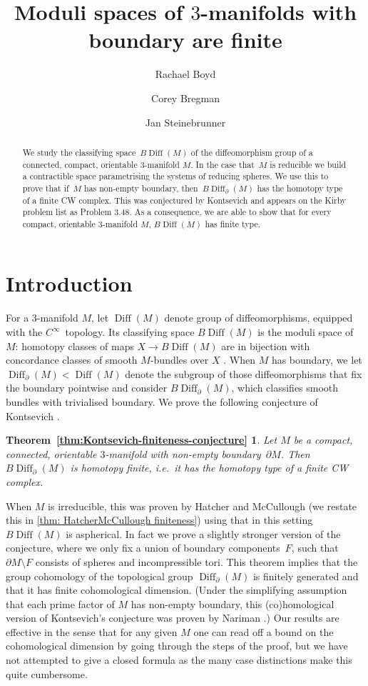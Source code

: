 \documentclass{amsart}
\title{Moduli spaces of $3$-manifolds with boundary are finite}
\author{Rachael Boyd}
\author{Corey Bregman}
\author{Jan Steinebrunner}
\theoremstyle{plain}
\theoremstyle{definition}
\DeclareMathOperator\Diff{Diff}
\newcommand{\DiffB}{\Diff_\partial}
\newcommand{\BDiff}{B\!\Diff}
\newcommand{\fakeenv}{} %
\newenvironment{restate}[2]  %
{
  \renewcommand{\fakeenv}{#2}   %
  \theoremstyle{plain}
  \newtheorem*{\fakeenv}{#1~\ref{#2}} %
  \begin{\fakeenv}  
}
{ \end{\fakeenv} }
\begin{document}
\newpage
\begin{abstract}
    We study the classifying space~$\BDiff(M)$ of the diffeomorphism group of a connected, compact, orientable 3-manifold $M$. In the case that~$M$ is reducible we build a contractible space parametrising the systems of reducing spheres. We use this to prove that if~$M$ has non-empty boundary, then~$\BDiff_\partial(M)$ has the homotopy type of a finite CW complex. This was conjectured by Kontsevich and appears on the Kirby problem list as Problem 3.48. As a consequence, we are able to show that for every compact, orientable $3$-manifold $M$, $\BDiff(M)$ has finite type.
\end{abstract}
\maketitle

\setcounter{tocdepth}{1} 
\tableofcontents

\section{Introduction}
For a $3$-manifold $M$, let $\Diff(M)$ denote group of diffeomorphisms, equipped with the $C^\infty$~topology.
Its classifying space $\BDiff(M)$ is the moduli space of $M$: homotopy classes of maps $X \to \BDiff(M)$ are in bijection with concordance classes of smooth $M$-bundles over $X$ \cite{GRW-users-guide}.
When $M$ has boundary, we let $\DiffB(M) < \Diff(M)$ denote the subgroup of those diffeomorphisms that fix the boundary pointwise and consider $\BDiff_\partial(M)$, which classifies smooth bundles with trivialised boundary.
We prove the following conjecture of Kontsevich \cite[Problem 3.48]{KirbyProblems}.


\begin{restate}{Theorem}{thm:Kontsevich-finiteness-conjecture}
    Let $M$ be a compact, connected, orientable $3$-manifold with non-empty boundary~$\partial M$.
    Then 
        $\BDiff_\partial(M)$
    is \emph{homotopy finite}, 
    i.e.~it has the homotopy type of a finite CW complex.
\end{restate}

When $M$ is irreducible, this was proven by Hatcher and McCullough \cite{HatcherMcCullough} (we restate this in \cref{thm: HatcherMcCullough finiteness}) using that in this setting~$\BDiff(M)$ is aspherical. 
% 
In fact we prove a slightly stronger version of the conjecture, where we only fix a union of boundary components~$F$, such that $\partial M \setminus F$ consists of spheres and incompressible tori.
This theorem implies that the group cohomology of the topological group $\Diff_\partial(M)$ is finitely generated and that it has finite cohomological dimension.
(Under the simplifying assumption that each prime factor of $M$ has non-empty boundary, this (co)homological version of Kontsevich's conjecture was proven by Nariman \cite{Nariman}.)
Our results are effective in the sense that for any given $M$ one can read off a bound on the cohomological dimension by going through the steps of the proof, but we have not attempted to give a closed formula as the many case distinctions make this quite cumbersome.
\end{document}
